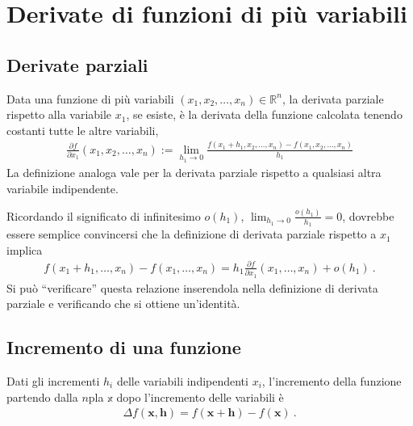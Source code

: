 \documentclass[letterpaper,10pt,english]{jupyterBook}
\begin{document}
\section{Derivate di funzioni di più variabili}
\label{\detokenize{ch/multivariable-calculus/derivatives:derivate-di-funzioni-di-piu-variabili}}\label{\detokenize{ch/multivariable-calculus/derivatives:multivariable-calculus-derivatives}}\label{\detokenize{ch/multivariable-calculus/derivatives::doc}}

\subsection{Derivate parziali}
\label{\detokenize{ch/multivariable-calculus/derivatives:derivate-parziali}}
\sphinxAtStartPar
Data una funzione di più variabili \((x_1, x_2, \dots, x_n) \in \mathbb{R}^n\), la derivata parziale rispetto alla variabile \(x_1\), se esiste, è la derivata della funzione calcolata tenendo costanti tutte le altre variabili,
\begin{equation*}
\begin{split}\frac{\partial f}{\partial x_1}(x_1, x_2, \dots, x_n) := \lim_{h_1 \rightarrow 0} \frac{f(x_1+h_1, x_2, \dots, x_n) - f(x_1, x_2, \dots, x_n)}{h_1}\end{split}
\end{equation*}
\sphinxAtStartPar
La definizione analoga vale per la derivata parziale rispetto a qualsiasi altra variabile indipendente.

\sphinxAtStartPar
Ricordando il significato di infinitesimo \(o(h_1)\), \(\lim_{h_1 \rightarrow 0} \frac{o(h_1)}{h_1} = 0\), dovrebbe essere semplice convincersi che la definizione di derivata parziale rispetto a \(x_1\) implica
\begin{equation}\label{equation:ch/multivariable-calculus/derivatives:multivariable-calculus:derivatives:partial:differential}
\begin{split}
  f(x_1+h_1, \dots, x_n) - f(x_1, \dots, x_n) = h_1 \frac{\partial f}{\partial x_1}(x_1, \dots, x_n) + o(h_1) \ .
\end{split}
\end{equation}
\sphinxAtStartPar
Si può “verificare” questa relazione inserendola nella definizione di derivata parziale e verificando che si ottiene un’identità.


\subsection{Incremento di una funzione}
\label{\detokenize{ch/multivariable-calculus/derivatives:incremento-di-una-funzione}}
\sphinxAtStartPar
Dati gli incrementi \(h_i\) delle variabili indipendenti \(x_i\), l’incremento della funzione partendo dalla \(n\)\sphinxhyphen{}pla \(\mathbb{x}\) dopo l’incremento delle variabili è
\begin{equation*}
\begin{split}\Delta f(\mathbf{x}, \mathbf{h}) = f(\mathbf{x} + \mathbf{h}) - f(\mathbf{x}) \ .\end{split}
\end{equation*}
\end{document}

